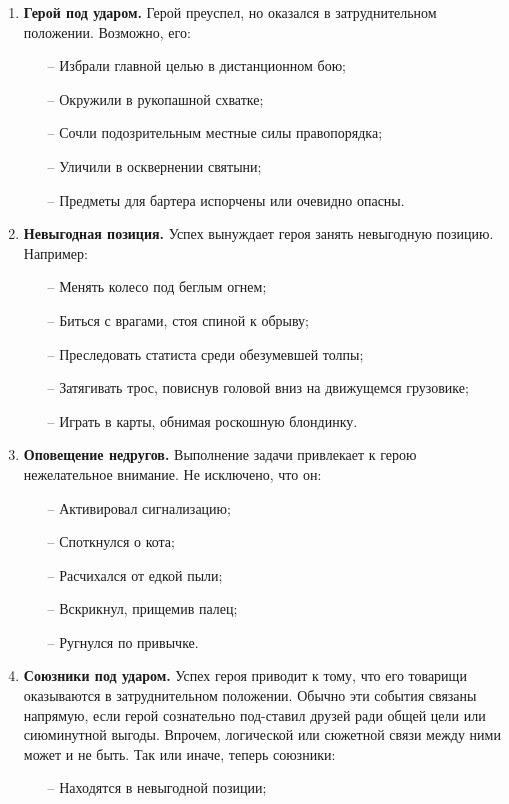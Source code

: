 \begin{enumerate}
\item \textbf{Герой под ударом.} Герой преуспел, но оказался в затруднительном положении. Возможно, его:
\begin{itemize}
    \item[--] Избрали главной целью в дистанционном бою;
    \item[--] Окружили в рукопашной схватке;
    \item[--] Сочли подозрительным местные силы правопорядка;
    \item[--] Уличили в осквернении святыни;
    \item[--] Предметы для бартера испорчены или очевидно опасны.
\end{itemize}
\item \textbf{Невыгодная позиция.} Успех вынуждает героя занять невыгодную позицию. Например:
\begin{itemize}
    \item[--] Менять колесо под беглым огнем;
    \item[--] Биться с врагами, стоя спиной к обрыву;
    \item[--] Преследовать статиста среди обезумевшей толпы;
    \item[--] Затягивать трос, повиснув головой вниз на движущемся грузовике;
    \item[--] Играть в карты, обнимая роскошную блондинку.
\end{itemize}
\item \textbf{Оповещение недругов.} Выполнение задачи привлекает к герою нежелательное внимание. Не исключено, что он:
\begin{itemize}
    \item[--] Активировал сигнализацию;
    \item[--] Споткнулся о кота;
    \item[--] Расчихался от едкой пыли;
    \item[--] Вскрикнул, прищемив палец;
    \item[--] Ругнулся по привычке. 
\end{itemize}
\item \textbf{Союзники под ударом.} Успех героя приводит к тому, что его товарищи оказываются в затруднительном положении. Обычно эти события связаны напрямую, если герой сознательно под-ставил друзей ради общей цели или сиюминутной выгоды. Впрочем, логической или сюжетной связи между ними может и не быть. Так или иначе, теперь союзники:
\begin{itemize}
    \item[--] Находятся в невыгодной позиции;

\end{itemize}
\end{enumerate}
